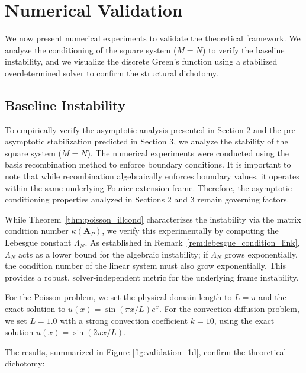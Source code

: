 \documentclass[pdflatex,sn-mathphys-num]{sn-jnl}%
\theoremstyle{thmstyleone}%
\newcommand{\mat}[1]{\mathbf{#1}}
\begin{document}
\section{Numerical Validation}

We now present numerical experiments to validate the theoretical framework. We analyze the conditioning of the square system ($M=N$) to verify the baseline instability, and we visualize the discrete Green's function using a stabilized overdetermined solver to confirm the structural dichotomy.

\subsection{Baseline Instability}
To empirically verify the asymptotic analysis presented in Section 2 and the pre-asymptotic stabilization predicted in Section 3, we analyze the stability of the square system ($M=N$). The numerical experiments were conducted using the basis recombination method to enforce boundary conditions. It is important to note that while recombination algebraically enforces boundary values, it operates within the same underlying Fourier extension frame. Therefore, the asymptotic conditioning properties analyzed in Sections 2 and 3 remain governing factors.

While Theorem~\ref{thm:poisson_illcond} characterizes the instability via the matrix condition number $\kappa(\mat{A}_P)$, we verify this experimentally by computing the Lebesgue constant $\Lambda_N$. As established in Remark~\ref{rem:lebesgue_condition_link}, $\Lambda_N$ acts as a lower bound for the algebraic instability; if $\Lambda_N$ grows exponentially, the condition number of the linear system must also grow exponentially. This provides a robust, solver-independent metric for the underlying frame instability.

For the Poisson problem, we set the physical domain length to $L=\pi$ and the exact solution to $u(x) = \sin(\pi x/L)e^x$. For the convection-diffusion problem, we set $L=1.0$ with a strong convection coefficient $k=10$, using the exact solution $u(x) = \sin(2\pi x/L)$.

The results, summarized in Figure \ref{fig:validation_1d}, confirm the theoretical dichotomy:
\end{document}
